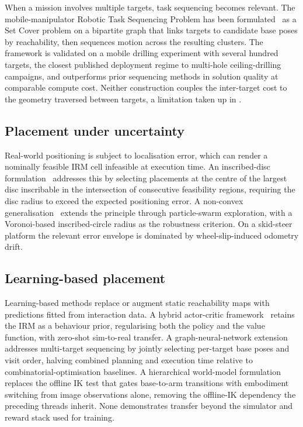 \documentclass[11pt,a4paper]{article}
\begin{document}
When a mission involves multiple targets, task sequencing becomes relevant. The mobile-manipulator Robotic Task Sequencing Problem has been formulated~\parencite{nguyenTaskSpaceClusteringMobile2023} as a Set Cover problem on a bipartite graph that links targets to candidate base poses by reachability, then sequences motion across the resulting clusters. The framework is validated on a mobile drilling experiment with several hundred targets, the closest published deployment regime to multi-hole ceiling-drilling campaigns, and outperforms prior sequencing methods in solution quality at comparable compute cost. Neither construction couples the inter-target cost to the geometry traversed between targets, a limitation taken up in .

\subsection{Placement under uncertainty}

Real-world positioning is subject to localisation error, which can render a nominally feasible IRM cell infeasible at execution time. An inscribed-disc formulation~\parencite{xu2020planning} addresses this by selecting placements at the centre of the largest disc inscribable in the intersection of consecutive feasibility regions, requiring the disc radius to exceed the expected positioning error. A non-convex generalisation~\parencite{gautierOptimizingRobotPositioning2025} extends the principle through particle-swarm exploration, with a Voronoi-based inscribed-circle radius as the robustness criterion. On a skid-steer platform the relevant error envelope is dominated by wheel-slip-induced odometry drift.

\subsection{Learning-based placement}

Learning-based methods replace or augment static reachability maps with predictions fitted from interaction data. A hybrid actor-critic framework~\parencite{jauhriRobotLearningMobile2022} retains the IRM as a behaviour prior, regularising both the policy and the value function, with zero-shot sim-to-real transfer. A graph-neural-network extension~\parencite{naik2024basenet} addresses multi-target sequencing by jointly selecting per-target base poses and visit order, halving combined planning and execution time relative to combinatorial-optimisation baselines. A hierarchical world-model formulation~\parencite{fengPredictiveReachabilityEmbodiment2024} replaces the offline IK test that gates base-to-arm transitions with embodiment switching from image observations alone, removing the offline-IK dependency the preceding threads inherit. None demonstrates transfer beyond the simulator and reward stack used for training.
\end{document}
